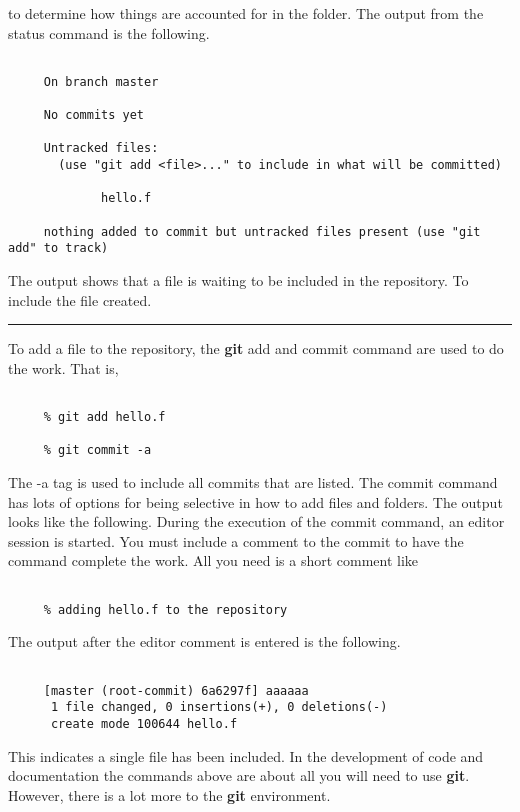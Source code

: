 \documentclass[10pt,fleqn]{article}
\begin{document}
to determine how things are accounted for in the folder. The output from the
status command is the following.
\begin{verbatim}

     On branch master

     No commits yet

     Untracked files:
       (use "git add <file>..." to include in what will be committed)

             hello.f

     nothing added to commit but untracked files present (use "git add" to track)

\end{verbatim}
The output shows that a file is waiting to be included in the repository. To
include the file created.
\vskip0.1in\hrule\vskip0.1in
\noindent
To add a file to the repository, the {\bf git} add and commit command are used
to do the work.  That is,
\begin{verbatim}

     % git add hello.f

     % git commit -a

\end{verbatim}
The -a tag is used to include all commits that are listed. The commit command
has lots of options for being selective in how to add files and folders. The
output looks like the following. During the execution of the commit command, 
an editor session is started. You must include a comment to the commit to have
the command complete the work. All you need is a short comment like
\begin{verbatim}

     % adding hello.f to the repository

\end{verbatim}
The output after the editor comment is entered is the following.
\begin{verbatim}

     [master (root-commit) 6a6297f] aaaaaa
      1 file changed, 0 insertions(+), 0 deletions(-)
      create mode 100644 hello.f

\end{verbatim}
This indicates a single file has been included. In the development of code and
documentation the commands above are about all you will need to use {\bf git}.
However, there is a lot more to the {\bf git} environment.
\end{document}
